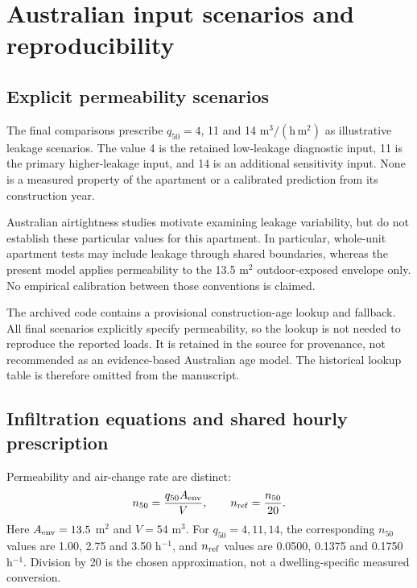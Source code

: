 \section{Australian input scenarios and reproducibility}
\label{app:australian}
\subsection{Explicit permeability scenarios}
\label{app:age}
The final comparisons prescribe $q_{50}=4$, 11 and 14 $\mathrm{m^3/(h\,m^2)}$ as illustrative leakage scenarios. The value 4 is the retained low-leakage diagnostic input, 11 is the primary higher-leakage input, and 14 is an additional sensitivity input. None is a measured property of the apartment or a calibrated prediction from its construction year.

Australian airtightness studies motivate examining leakage variability, but do not establish these particular values for this apartment. In particular, whole-unit apartment tests may include leakage through shared boundaries, whereas the present model applies permeability to the 13.5 m$^2$ outdoor-exposed envelope only. No empirical calibration between those conventions is claimed.

The archived code contains a provisional construction-age lookup and fallback. All final scenarios explicitly specify permeability, so the lookup is not needed to reproduce the reported loads. It is retained in the source for provenance, not recommended as an evidence-based Australian age model. The historical lookup table is therefore omitted from the manuscript.

\subsection{Infiltration equations and shared hourly prescription}
\label{app:infiltration}
Permeability and air-change rate are distinct:
\begin{equation}
n_{50}=\frac{q_{50}A_{\rm env}}{V},\qquad n_{\rm ref}=\frac{n_{50}}{20}.
\end{equation}
Here $A_{\rm env}=13.5$ m$^2$ and $V=54$ m$^3$. For $q_{50}=4,11,14$, the corresponding $n_{50}$ values are 1.00, 2.75 and 3.50 h$^{-1}$, and $n_{\rm ref}$ values are 0.0500, 0.1375 and 0.1750 h$^{-1}$. Division by 20 is the chosen approximation, not a dwelling-specific measured conversion.

